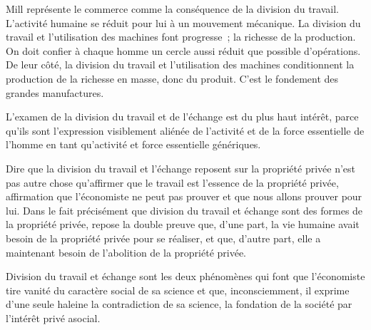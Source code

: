 \documentclass[french,twoside]{book} %
\begin{document}
Mill représente le commerce comme la conséquence de la division du travail. L’activité humaine se réduit pour lui à un mouvement mécanique. La division du travail et l’utilisation des machines font progresse ; la richesse de la production. On doit confier à chaque homme un cercle aussi réduit que possible d’opérations. De leur côté, la division du travail et l’utilisation des machines conditionnent la production de la richesse en masse, donc du produit. C’est le fondement des grandes manufactures.\par
\bigbreak
\noindent [XXXVIII] L’examen de la division du travail et de l’échange est du plus haut intérêt, parce qu’ils sont l’expression visiblement aliénée de l’activité et de la force essentielle de l’homme en tant qu’activité et force essentielle génériques.\par
Dire que la division du travail et l’échange reposent sur la propriété privée n’est pas autre chose qu’affirmer que le travail est l’essence de la propriété privée, affirmation que l’économiste ne peut pas prouver et que nous allons prouver pour lui. Dans le fait précisément que division du travail et échange sont des formes de la propriété privée, repose la double preuve que, d’une part, la vie humaine avait besoin de la propriété privée pour se réaliser, et que, d’autre part, elle a maintenant besoin de l’abolition de la propriété privée.\par
Division du travail et échange sont les deux phénomènes qui font que l’économiste tire vanité du caractère social de sa science et que, inconsciemment, il exprime d’une seule haleine la contradiction de sa science, la fondation de la société par l’intérêt privé asocial.\par
\end{document}
